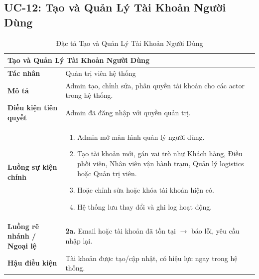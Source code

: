 \subsection{UC-12: Tạo và Quản Lý Tài Khoản Người Dùng}
\begin{table}[H]
  \centering
  \begin{tabularx}{\textwidth}{|l|X|}
    \hline
    \multicolumn{2}{|l|}{\textbf{Tạo và Quản Lý Tài Khoản Người Dùng}} \\
    \hline
    \textbf{Tác nhân}           & Quản trị viên hệ thống \\ \hline
    \textbf{Mô tả}              & Admin tạo, chỉnh sửa, phân quyền tài khoản cho các actor trong hệ thống. \\ \hline
    \textbf{Điều kiện tiên quyết} & Admin đã đăng nhập với quyền quản trị. \\ \hline
    \textbf{Luồng sự kiện chính} &
      \begin{enumerate}[leftmargin=*, nosep, topsep=0pt]
        \item Admin mở màn hình quản lý người dùng.
        \item Tạo tài khoản mới, gán vai trò như Khách hàng, Điều phối viên, Nhân viên vận hành trạm, Quản lý logistics hoặc Quản trị viên.
        \item Hoặc chỉnh sửa hoặc khóa tài khoản hiện có.
        \item Hệ thống lưu thay đổi và ghi log hoạt động.
      \end{enumerate} \\ \hline
    \textbf{Luồng rẽ nhánh / Ngoại lệ} &
      \textbf{2a.} Email hoặc tài khoản đã tồn tại $\rightarrow$ báo lỗi, yêu cầu nhập lại. \\ \hline
    \textbf{Hậu điều kiện}      & Tài khoản được tạo/cập nhật, có hiệu lực ngay trong hệ thống. \\
    \hline
  \end{tabularx}
  \caption{Đặc tả Tạo và Quản Lý Tài Khoản Người Dùng}
  \label{tab:uc12}
\end{table}

